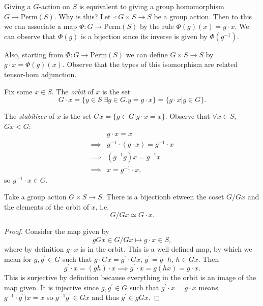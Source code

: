\documentclass{article}
\begin{document}
\begin{remark}
Giving a $G$-action on $S$ is equivalent to giving a group
homomorphism $G \to \mathrm{Perm}(S)$. Why is this? Let
$\cdot : G \times S \to S$ be a group action. Then to this we can
associate a map $\Phi : G \to \mathrm{Perm}(S)$ by the rule
$\Phi(g)(x) = g \cdot x$. We can observe that $\Phi(g)$ is a bijection
since its inverse is given by $\Phi(g^{-1})$. 

Also, starting from $\Phi : G \to \mathrm{Perm}(S)$ we can define
$G \times S \to S$ by $g \cdot x = \Phi(g)(x)$. Observe that the types
of this isomorphism are related tensor-hom adjunction.
\end{remark}

\begin{defn}
Fix some $x \in S$. The \emph{orbit} of $x$ is the set
$$
G \cdot x = \{ y \in S | \exists g \in G . y = g \cdot x \} 
          = \{ g \cdot x | g \in G \}.
$$

The \emph{stabilizer} of $x$ is the set 
$Gx = \{ g \in G | g \cdot x = x \}$. Observe that 
$\forall x \in S$, $Gx < G$:
\begin{align*}
         & g \cdot x = x \\
\implies & g^{-1} \cdot (g \cdot x) = g^{-1} \cdot x \\
\implies & (g^{-1} g) x = g^{-1} x \\
\implies & x = g^{-1} \cdot x,
\end{align*}
so $g^{-1} \cdot x \in G$.
\end{defn}

\begin{prop}
Take a group action $G \times S \to S$. There is a bijectionb etween
the coset $G / Gx$ and the elements of the orbit of $x$, i.e.
$$
G / Gx \simeq G \cdot x.
$$
\end{prop}
\begin{proof}
Consider the map given by
$$
gGx \in G / Gx \mapsto g \cdot x \in S,
$$
where by definition $g \cdot x$ is in the orbit. This is a
well-defined map, by which we mean for $g, g^\prime \in G$ such that
$g \cdot Gx = g^\prime \cdot Gx$, $g^\prime = g \cdot h$, $h \in
Gx$. Then 
$$
g^\prime \cdot x = (g h) \cdot x 
\implies g^\prime \cdot x = g(hx) = g \cdot x.
$$
This is surjective by definition because everything in the orbit is an
image of the map given. It is injective since $g, g^\prime \in G$ such
that $g^\prime \cdot x = g \cdot x$ means $g^{-1} \cdot g^\prime) x =
x$ so $g^{-1} g^\prime \in G x$ and thus $g^\prime \in g G x$.
\end{proof}
\end{document}
